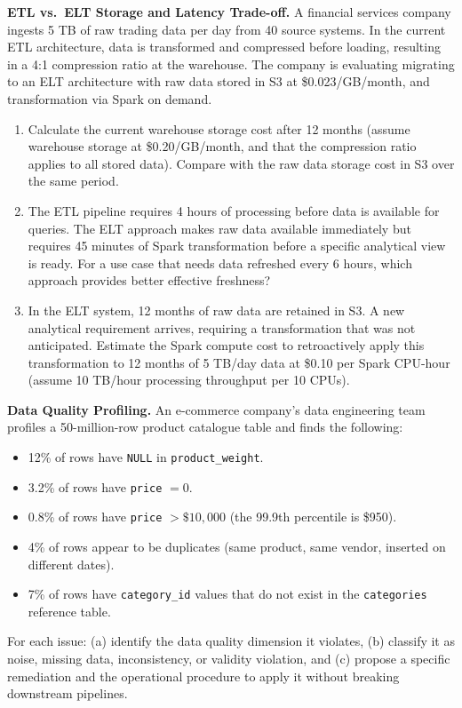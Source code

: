 \ap \textbf{ETL vs.\ ELT Storage and Latency Trade-off.}
A financial services company ingests 5 TB of raw trading data per day
from 40 source systems. In the current ETL architecture, data is
transformed and compressed before loading, resulting in a 4:1
compression ratio at the warehouse. The company is evaluating
migrating to an ELT architecture with raw data stored in S3 at
\$0.023/GB/month, and transformation via Spark on demand.

\begin{enumerate}[label=(\alph*)]
  \item Calculate the current warehouse storage cost after 12 months
        (assume warehouse storage at \$0.20/GB/month, and that the
        compression ratio applies to all stored data). Compare with the
        raw data storage cost in S3 over the same period.
  \item The ETL pipeline requires 4 hours of processing before data is
        available for queries. The ELT approach makes raw data available
        immediately but requires 45 minutes of Spark transformation
        before a specific analytical view is ready. For a use case that
        needs data refreshed every 6 hours, which approach provides
        better effective freshness?
  \item In the ELT system, 12 months of raw data are retained in S3.
        A new analytical requirement arrives, requiring a transformation
        that was not anticipated. Estimate the Spark compute cost to
        retroactively apply this transformation to 12 months of 5 TB/day
        data at \$0.10 per Spark CPU-hour (assume 10 TB/hour processing
        throughput per 10 CPUs).
\end{enumerate}

\ap \textbf{Data Quality Profiling.}
An e-commerce company's data engineering team profiles a 50-million-row
product catalogue table and finds the following:
\begin{itemize}
  \item 12\% of rows have \texttt{NULL} in \texttt{product\_weight}.
  \item 3.2\% of rows have \texttt{price} $= 0$.
  \item 0.8\% of rows have \texttt{price} $> \$10{,}000$ (the 99.9th
        percentile is \$950).
  \item 4\% of rows appear to be duplicates (same product, same vendor,
        inserted on different dates).
  \item 7\% of rows have \texttt{category\_id} values that do not exist
        in the \texttt{categories} reference table.
\end{itemize}
For each issue: (a) identify the data quality dimension it violates,
(b) classify it as noise, missing data, inconsistency, or validity
violation, and (c) propose a specific remediation and the operational
procedure to apply it without breaking downstream pipelines.

